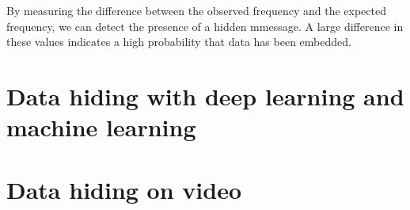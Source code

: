         By measuring the difference between the observed frequency and the
        expected frequency, we can detect the presence of a hidden mmessage.
        A large difference in these values indicates a high probability that
        data has been embedded.
\chapter{Data hiding with deep learning and machine learning}
\chapter{Data hiding on video}

